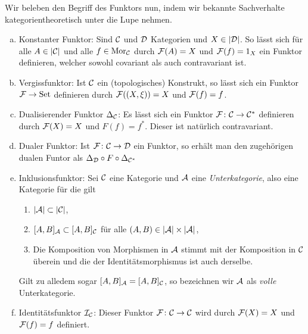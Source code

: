 Wir beleben den Begriff des Funktors nun, indem wir bekannte Sachverhalte kategorientheoretisch unter die Lupe nehmen.

\begin{ex}
  \label{ex:Example}
\begin{enumerate}[a)]
    \item Konstanter Funktor: Sind $\mathcal{C}$ und $\mathcal{D}$ Kategorien und $X \in |\mathcal{D}|$.
      So lässt sich für alle $A \in |\mathcal{C}|$ und alle $f \in \mathrm{Mor}_{\mathcal{C}}$ durch $\mathcal{F}(A) = X$ und $\mathcal{F}(f) = 1_X$ ein Funktor definieren, welcher sowohl covariant als auch contravariant ist.
    \item Vergissfunktor: Ist $\mathcal{C}$ ein (topologisches) Konstrukt, so lässt sich ein Funktor $\mathcal{F} \to \mathrm{Set}$ definieren durch $\mathcal{F}((X, \xi)) = X$ und $\mathcal{F}(f) = f$.
    \item Dualisierender Funktor $\Delta_{\mathcal{C}}$: Es lässt sich ein Funktor $\mathcal{F} \colon \mathcal{C} \to \mathcal{C}^*$ definieren durch $\mathcal{F}(X) = X$ und $F(f) = f^*$. Dieser ist natürlich contravariant.
    \item Dualer Funktor: Ist $\mathcal{F} \colon \mathcal{C} \to \mathcal{D}$ ein Funktor, so erhält man den zugehörigen dualen Funtor als $\Delta_{\mathcal{D}} \circ F \circ \Delta_{\mathcal{C}^*}$
    \item Inklusionsfunktor: Sei $\mathcal{C}$ eine Kategorie und $\mathcal{A}$ eine \emph{Unterkategorie}, also eine Kategorie für die gilt
      \begin{enumerate}
        \item $|\mathcal{A}| \subset |\mathcal{C}|$,
        \item $[A, B]_{\mathcal{A}} \subset [A,B]_{\mathcal{C}}$ für alle $(A, B) \in |\mathcal{A}| \times |\mathcal{A}|$,
        \item Die Komposition von Morphismen in $\mathcal{A}$ stimmt mit der Komposition in $\mathcal{C}$ überein und die der Identitätsmorphismus ist auch derselbe.
      \end{enumerate}
      Gilt zu alledem sogar $[A, B]_{\mathcal{A}} = [A, B]_{\mathcal{C}}$, so bezeichnen wir $\mathcal{A}$ als \emph{volle} Unterkategorie.
    \item Identitätsfunktor $\mathcal{I}_{\mathcal{C}}$: Dieser Funktor $\mathcal{F} \colon \mathcal{C} \to \mathcal{C}$ wird durch $\mathcal{F}(X) = X$ und $\mathcal{F}(f) = f$ definiert.
  \end{enumerate}
\end{ex}

